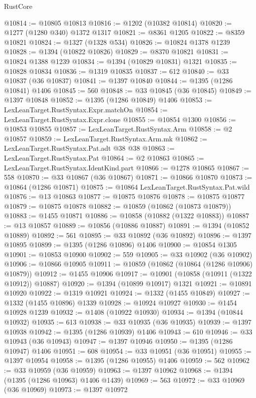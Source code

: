 \begin{lexlean}{RustCore}
\begin{coremodule}
@10814 := @10805 @10813
@10816 := @1202 (@10382 @10814)
@10820 := @1277 (@1280 @340) @1372 @1317
@10821 := @8361 @1205
@10822 := @8359 @10821
@10824 := @1327 (@1328 @534)
@10826 := @10824 @1378 @1239
@10828 := @1394 (@10822 @10826)
@10829 := @8370 @10821
@10831 := @10824 @1388 @1239
@10834 := @1394 (@10829 @10831) @1321
@10835 := @10828 @10834
@10836 := @1319 @10835
@10837 := 612
@10840 := @33 @10837 (@36 @10837)
@10841 := @1397 @10840
@10844 := @1395 (@1286 @10841) @1406
@10845 := 560
@10848 := @33 @10845 (@36 @10845)
@10849 := @1397 @10848
@10852 := @1395 (@1286 @10849) @1406
@10853 := LexLeanTarget.RustSyntax.Expr.matchOn
@10854 := LexLeanTarget.RustSyntax.Expr.clone
@10855 := @10854 @1300
@10856 := @10853 @10855
@10857 := LexLeanTarget.RustSyntax.Arm
@10858 := @2 @10857
@10859 := LexLeanTarget.RustSyntax.Arm.mk
@10862 := LexLeanTarget.RustSyntax.Pat.adt @38 @38
@10863 := LexLeanTarget.RustSyntax.Pat
@10864 := @2 @10863
@10865 := LexLeanTarget.RustSyntax.IdentKind.part
@10866 := @1278 @10865
@10867 := 558
@10870 := @33 @10867 (@36 @10867)
@10871 := @10866 @10870
@10873 := @10864 (@1286 @10871)
@10875 := @10864 LexLeanTarget.RustSyntax.Pat.wild
@10876 := @13 @10863
@10877 := @10875 @10876
@10878 := @10875 @10877
@10879 := @10875 @10878
@10882 := @10859 (@10862 (@10873 @10879))
@10883 := @1455 @10871
@10886 := @10858 (@10882 (@1322 @10883))
@10887 := @13 @10857
@10889 := @10856 (@10886 @10887)
@10891 := @1394 (@10852 @10889)
@10892 := 561
@10895 := @33 @10892 (@36 @10892)
@10896 := @1397 @10895
@10899 := @1395 (@1286 @10896) @1406
@10900 := @10854 @1305
@10901 := @10853 @10900
@10902 := 559
@10905 := @33 @10902 (@36 @10902)
@10906 := @10866 @10905
@10911 := @10859 (@10862 (@10864 (@1286 @10906) @10879))
@10912 := @1455 @10906
@10917 := @10901 (@10858 (@10911 (@1322 @10912)) @10887)
@10920 := @1394 (@10899 @10917) @1321
@10921 := @10891 @10920
@10922 := @1319 @10921
@10924 := @1332 (@1455 @10849)
@10927 := @1332 (@1455 @10896) @1339
@10928 := @10924 @10927
@10930 := @1454 @10928 @1239
@10932 := @1408 (@10922 @10930)
@10934 := @1394 (@10844 @10932)
@10935 := 613
@10938 := @33 @10935 (@36 @10935)
@10939 := @1397 @10938
@10942 := @1395 (@1286 @10939) @1406
@10943 := 610
@10946 := @33 @10943 (@36 @10943)
@10947 := @1397 @10946
@10950 := @1395 (@1286 @10947) @1406
@10951 := 608
@10954 := @33 @10951 (@36 @10951)
@10955 := @1397 @10954
@10958 := @1395 (@1286 @10955) @1406
@10959 := 562
@10962 := @33 @10959 (@36 @10959)
@10963 := @1397 @10962
@10968 := @1394 (@1395 (@1286 @10963) @1406 @1439)
@10969 := 563
@10972 := @33 @10969 (@36 @10969)
@10973 := @1397 @10972

\end{coremodule}
\end{lexlean}
